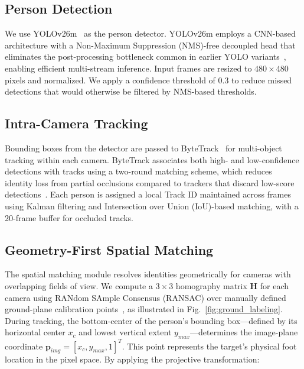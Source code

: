 \documentclass[conference]{IEEEtran}
\begin{document}
\subsection{Person Detection}
\label{subsec:person-detection}

We use YOLOv26m~\cite{yolov26m} as the person detector. YOLOv26m employs a CNN-based architecture with a Non-Maximum Suppression (NMS)-free decoupled head that eliminates the post-processing bottleneck common in earlier YOLO variants~\cite{yolov8}, enabling efficient multi-stream inference. Input frames are resized to $480 \times 480$ pixels and normalized. We apply a confidence threshold of 0.3 to reduce missed detections that would otherwise be filtered by NMS-based thresholds.

\subsection{Intra-Camera Tracking}
\label{subsec:intra-camera-tracking}

Bounding boxes from the detector are passed to ByteTrack~\cite{bytetrack} for multi-object tracking within each camera. ByteTrack associates both high- and low-confidence detections with tracks using a two-round matching scheme, which reduces identity loss from partial occlusions compared to trackers that discard low-score detections~\cite{sort}. Each person is assigned a local Track ID maintained across frames using Kalman filtering and Intersection over Union (IoU)-based matching, with a 20-frame buffer for occluded tracks.

\subsection{Geometry-First Spatial Matching}
\label{subsec:spatial-matching}

The spatial matching module resolves identities geometrically for cameras with overlapping fields of view. We compute a $3 \times 3$ homography matrix $\mathbf{H}$ for each camera using RANdom SAmple Consensus (RANSAC) over manually defined ground-plane calibration points~\cite{homography_calib}, as illustrated in Fig.~\ref{fig:ground_labeling}. During tracking, the bottom-center of the person's bounding box---defined by its horizontal center $x_c$ and lowest vertical extent $y_{max}$---determines the image-plane coordinate $\mathbf{p}_{img} = [x_c, y_{max}, 1]^T$. This point represents the target's physical foot location in the pixel space. By applying the projective transformation:
\end{document}
